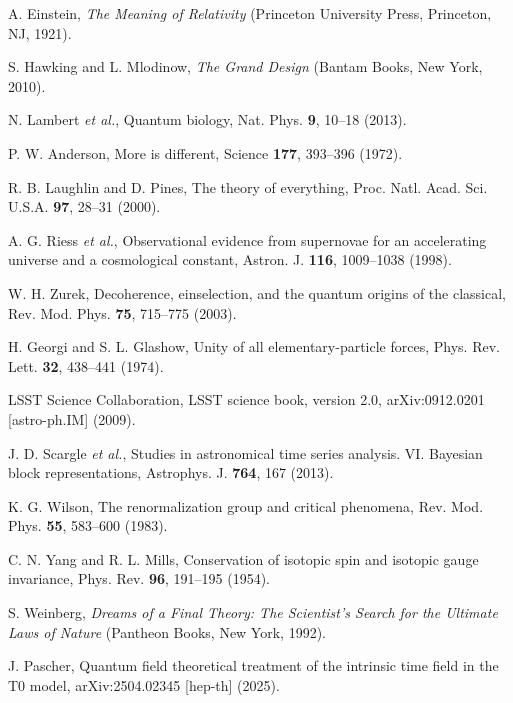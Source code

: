 \documentclass[twocolumn,aps,prl]{revtex4-2}
\begin{document}
\begin{thebibliography}{99}
		 A. Einstein, \textit{The Meaning of Relativity} (Princeton University Press, Princeton, NJ, 1921).
		
		 S. Hawking and L. Mlodinow, \textit{The Grand Design} (Bantam Books, New York, 2010).
		
		 N. Lambert \textit{et al.}, Quantum biology, Nat. Phys. \textbf{9}, 10--18 (2013).
		
		 P. W. Anderson, More is different, Science \textbf{177}, 393--396 (1972).
		
		 R. B. Laughlin and D. Pines, The theory of everything, Proc. Natl. Acad. Sci. U.S.A. \textbf{97}, 28--31 (2000).
		
		 A. G. Riess \textit{et al.}, Observational evidence from supernovae for an accelerating universe and a cosmological constant, Astron. J. \textbf{116}, 1009--1038 (1998).
		
		 W. H. Zurek, Decoherence, einselection, and the quantum origins of the classical, Rev. Mod. Phys. \textbf{75}, 715--775 (2003).
		
		 H. Georgi and S. L. Glashow, Unity of all elementary-particle forces, Phys. Rev. Lett. \textbf{32}, 438--441 (1974).
		
		 LSST Science Collaboration, LSST science book, version 2.0, arXiv:0912.0201 [astro-ph.IM] (2009).
		
		 J. D. Scargle \textit{et al.}, Studies in astronomical time series analysis. VI. Bayesian block representations, Astrophys. J. \textbf{764}, 167 (2013).
		
		 K. G. Wilson, The renormalization group and critical phenomena, Rev. Mod. Phys. \textbf{55}, 583--600 (1983).
		
		 C. N. Yang and R. L. Mills, Conservation of isotopic spin and isotopic gauge invariance, Phys. Rev. \textbf{96}, 191--195 (1954).
		
		 S. Weinberg, \textit{Dreams of a Final Theory: The Scientist's Search for the Ultimate Laws of Nature} (Pantheon Books, New York, 1992).
		
		 J. Pascher, Quantum field theoretical treatment of the intrinsic time field in the T0 model, arXiv:2504.02345 [hep-th] (2025).
		
	\end{thebibliography}
\end{document}
